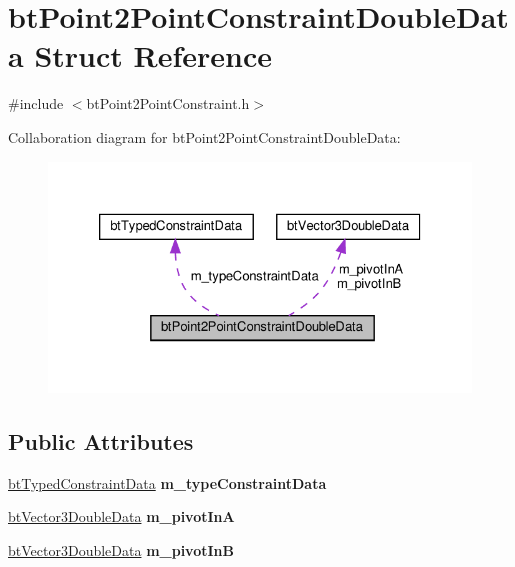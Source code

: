 \hypertarget{structbtPoint2PointConstraintDoubleData}{}\section{bt\+Point2\+Point\+Constraint\+Double\+Data Struct Reference}
\label{structbtPoint2PointConstraintDoubleData}


{\ttfamily \#include $<$bt\+Point2\+Point\+Constraint.\+h$>$}



Collaboration diagram for bt\+Point2\+Point\+Constraint\+Double\+Data\+:
\nopagebreak
\begin{figure}[H]
\begin{center}
\leavevmode
\includegraphics[width=326pt]{structbtPoint2PointConstraintDoubleData__coll__graph}
\end{center}
\end{figure}
\subsection*{Public Attributes}
\begin{DoxyCompactItemize}
\item 
\mbox{\label{structbtPoint2PointConstraintDoubleData_a42dbadbfc52d32d257d6893a0124f91f}} 
\hyperlink{structbtTypedConstraintData}{bt\+Typed\+Constraint\+Data} {\bfseries m\+\_\+type\+Constraint\+Data}
\item 
\mbox{\label{structbtPoint2PointConstraintDoubleData_a97e7529f6441ad6f415a727cd870f0b0}} 
\hyperlink{structbtVector3DoubleData}{bt\+Vector3\+Double\+Data} {\bfseries m\+\_\+pivot\+InA}
\item 
\mbox{\label{structbtPoint2PointConstraintDoubleData_ae5b448142428a472ad90138aa2635e47}} 
\hyperlink{structbtVector3DoubleData}{bt\+Vector3\+Double\+Data} {\bfseries m\+\_\+pivot\+InB}
\end{DoxyCompactItemize}


